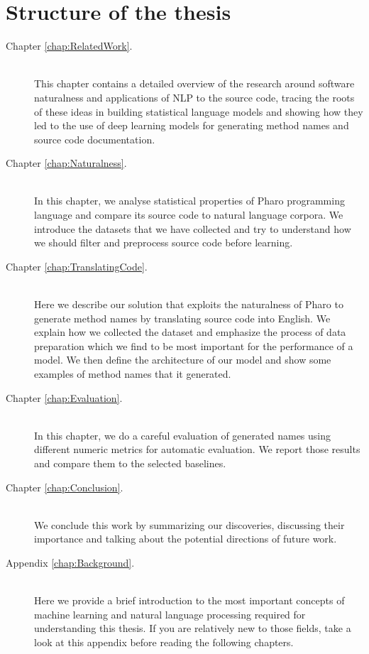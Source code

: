 \section{Structure of the thesis}

{\hypersetup{linkcolor=black}
\begin{description}
	\item [Chapter \ref{chap:RelatedWork}. ] \hfill \\
	This chapter contains a detailed overview of the research around software naturalness and applications of NLP to the source code, tracing the roots of these ideas in building statistical language models and showing how they led to the use of deep learning models for generating method names and source code documentation.
	\item [Chapter \ref{chap:Naturalness}. ] \hfill \\
	In this chapter, we analyse statistical properties of Pharo programming language and compare its source code to natural language corpora. We introduce the datasets that we have collected and try to understand how we should filter and preprocess source code before learning.
	\item [Chapter \ref{chap:TranslatingCode}. ] \hfill \\
	Here we describe our solution that exploits the naturalness of Pharo to generate method names by translating source code into English. We explain how we collected the dataset and emphasize the process of data preparation which we find to be most important for the performance of a model. We then define the architecture of our model and show some examples of method names that it generated.
	\item [Chapter \ref{chap:Evaluation}. ] \hfill \\
	In this chapter, we do a careful evaluation of generated names using different numeric metrics for automatic evaluation. We report those results and compare them to the selected baselines.
	\item [Chapter \ref{chap:Conclusion}. ] \hfill \\
	We conclude this work by summarizing our discoveries, discussing their importance and talking about the potential directions of future work.
	\item [Appendix \ref{chap:Background}. ] \hfill \\
	Here we provide a brief introduction to the most important concepts of machine learning and natural language processing required for understanding this thesis. If you are relatively new to those fields, take a look at this appendix before reading the following chapters.
\end{description}
}
